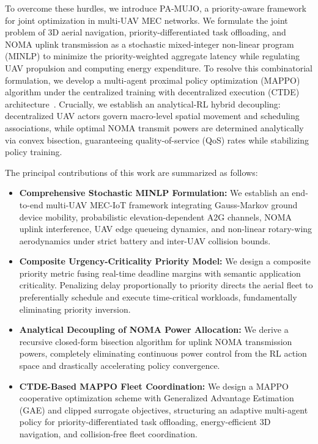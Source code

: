 \documentclass[journal]{IEEEtran}
\begin{document}
To overcome these hurdles, we introduce PA-MUJO, a priority-aware framework for joint optimization in multi-UAV MEC networks. We formulate the joint problem of 3D aerial navigation, priority-differentiated task offloading, and NOMA uplink transmission as a stochastic mixed-integer non-linear program (MINLP) to minimize the priority-weighted aggregate latency while regulating UAV propulsion and computing energy expenditure. To resolve this combinatorial formulation, we develop a multi-agent proximal policy optimization (MAPPO) algorithm under the centralized training with decentralized execution (CTDE) architecture~\cite{kang2023cooperative, yu2022mappo}. Crucially, we establish an analytical-RL hybrid decoupling: decentralized UAV actors govern macro-level spatial movement and scheduling associations, while optimal NOMA transmit powers are determined analytically via convex bisection, guaranteeing quality-of-service (QoS) rates while stabilizing policy training.

The principal contributions of this work are summarized as follows:
\begin{itemize}
    \item \textbf{Comprehensive Stochastic MINLP Formulation:} We establish an end-to-end multi-UAV MEC-IoT framework integrating Gauss-Markov ground device mobility, probabilistic elevation-dependent A2G channels, NOMA uplink interference, UAV edge queueing dynamics, and non-linear rotary-wing aerodynamics under strict battery and inter-UAV collision bounds.
    \item \textbf{Composite Urgency-Criticality Priority Model:} We design a composite priority metric fusing real-time deadline margins with semantic application criticality. Penalizing delay proportionally to priority directs the aerial fleet to preferentially schedule and execute time-critical workloads, fundamentally eliminating priority inversion.
    \item \textbf{Analytical Decoupling of NOMA Power Allocation:} We derive a recursive closed-form bisection algorithm for uplink NOMA transmission powers, completely eliminating continuous power control from the RL action space and drastically accelerating policy convergence.
    \item \textbf{CTDE-Based MAPPO Fleet Coordination:} We design a MAPPO cooperative optimization scheme with Generalized Advantage Estimation (GAE) and clipped surrogate objectives, structuring an adaptive multi-agent policy for priority-differentiated task offloading, energy-efficient 3D navigation, and collision-free fleet coordination.
\end{itemize}
\end{document}
